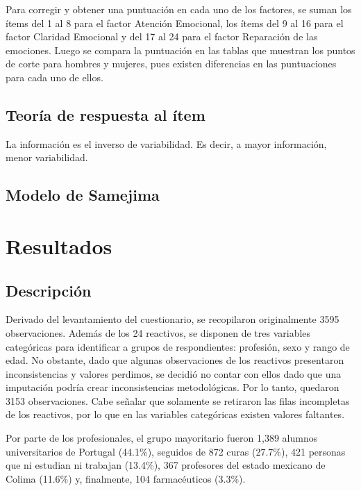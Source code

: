 \documentclass[
  10pt,
  spanish,
]{article}
\begin{document}
\addtocounter{table}{-2}

Para corregir y obtener una puntuación en cada uno de los factores, se
suman los ítems del 1 al 8 para el factor Atención Emocional, los ítems
del 9 al 16 para el factor Claridad Emocional y del 17 al 24 para el
factor Reparación de las emociones. Luego se compara la puntuación en
las tablas que muestran los puntos de corte para hombres y mujeres, pues
existen diferencias en las puntuaciones para cada uno de ellos.

\hypertarget{teoruxeda-de-respuesta-al-uxedtem}{%
\subsection{Teoría de respuesta al
ítem}\label{teoruxeda-de-respuesta-al-uxedtem}}

La información es el inverso de variabilidad. Es decir, a mayor
información, menor variabilidad.

\hypertarget{modelo-de-samejima}{%
\subsection{Modelo de Samejima}\label{modelo-de-samejima}}

\hypertarget{resultados}{%
\section{Resultados}\label{resultados}}

\hypertarget{descripciuxf3n}{%
\subsection{Descripción}\label{descripciuxf3n}}

Derivado del levantamiento del cuestionario, se recopilaron
originalmente 3595 observaciones. Además de los 24 reactivos, se
disponen de tres variables categóricas para identificar a grupos de
respondientes: profesión, sexo y rango de edad. No obstante, dado que
algunas observaciones de los reactivos presentaron inconsistencias y
valores perdimos, se decidió no contar con ellos dado que una imputación
podría crear inconsistencias metodológicas. Por lo tanto, quedaron 3153
observaciones. Cabe señalar que solamente se retiraron las filas
incompletas de los reactivos, por lo que en las variables categóricas
existen valores faltantes.

Por parte de los profesionales, el grupo mayoritario fueron 1,389
alumnos universitarios de Portugal (44.1\%), seguidos de 872 curas
(27.7\%), 421 personas que ni estudian ni trabajan (13.4\%), 367
profesores del estado mexicano de Colima (11.6\%) y, finalmente, 104
farmacéuticos (3.3\%).
\end{document}
